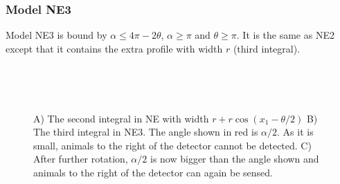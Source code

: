 \subsubsection{Model NE3} \label{NE3}

Model NE3 is bound by $\alpha \le 4\pi - 2\theta$, $\alpha \ge \pi$ and $\theta \ge \pi$. It is the same as NE2 except that it contains the extra profile with width $r$ (third integral).





\begin{figure}[t]
        \centering
        \begin{subfigure}[t]{0.3\textwidth}
                \centering
                \caption{}
                \label{f:NELimit}
        \end{subfigure}
        ~ 
        \begin{subfigure}[t]{0.3\textwidth}
                \centering
                \caption{}
                \label{f:NE3third}
        \end{subfigure}
        ~ 
        \begin{subfigure}[t]{0.3\textwidth}
                \centering
                \caption{}
                \label{f:NE3fourth}
        \end{subfigure}
\caption{A) The second integral in NE with width $r + r\cos(x_1 - \theta/2)$ B) The third integral in NE3. The angle shown in red is $\alpha/2$. As it is small, animals to the right of the detector cannot be detected. C) After further rotation, $\alpha/2$ is now bigger than the angle shown and animals to the right of the detector can again be sensed.   }
\label{f:NE}
\end{figure}


